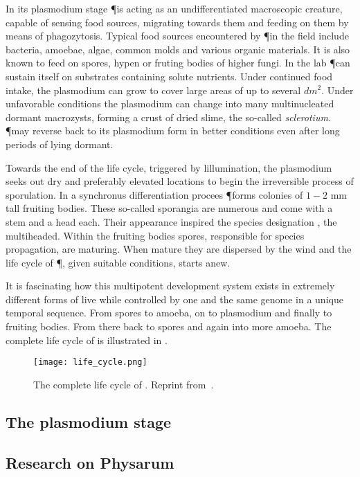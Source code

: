 In its plasmodium stage \P is acting as an undifferentiated macroscopic creature, capable of sensing food sources, migrating towards them and feeding on them by means of phagozytosis. Typical food sources encountered by \P in the field include bacteria, amoebae, algae, common molds and various organic materials. It is also known to feed on spores, hypen or fruting bodies of higher fungi. In the lab \P can sustain itself on substrates containing solute nutrients. Under continued food intake, the plasmodium can grow to cover large areas of up to  several $dm^2$. Under unfavorable conditions the plasmodium can change into many multinucleated dormant macrozysts, forming a crust of dried slime, the so-called \emph{sclerotium}. \P may reverse back to its plasmodium form in better conditions even after long periods of lying dormant.

Towards the end of the life cycle, triggered by lillumination, the plasmodium seeks out dry and preferably elevated locations to begin the irreversible process of sporulation. In a synchronus differentiation procees \P forms colonies of $1-2$ mm tall fruiting bodies. These so-called sporangia are numerous and come with a stem and a head each. Their appearance inspired the species designation \Pp, the multiheaded. Within the fruiting bodies spores, responsible for species propagation, are maturing. When mature they are dispersed by the wind and the life cycle of \P, given suitable conditions, starts anew.

It is fascinating how this multipotent development system exists in extremely different forms of live while controlled by one and the same genome in a unique temporal sequence. From spores to amoeba, on to plasmodium and finally to fruiting bodies. From there back to spores and again into more amoeba. The complete life cycle of \Pp is illustrated in .

\begin{figure}[ht]
	\centering
	\texttt{[image: life\_cycle.png]}
	\caption[Life cycle of \P]{The complete life cycle of \Pp. Reprint from~\cite{Sauer1986}.}
	\label{fig:life_cycle}
\end{figure}


\subsection{The plasmodium stage}

\subsection{Research on Physarum}

